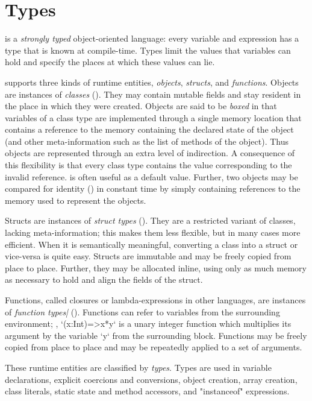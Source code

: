 \chapter{Types}
\label{XtenTypes}

{}\Xten{} is a {\em strongly typed} object-oriented language: every
variable and expression has a type that is known at compile-time.
Types limit the values that variables can hold and specify the places
at which these values can lie.


{}\Xten{} supports three kinds of runtime entities, {\em objects},
{\em structs}, and {\em functions}. Objects are instances of {\em
  classes} (). They may contain mutable fields
and stay resident in the place in which they were
created. 
Objects are said to be {\em boxed} in that variables of a
class type are implemented through a single memory location that
contains a reference to the memory containing the declared state of
the object (and other meta-information such as the list of methods of
the object). Thus objects are represented through an extra level of
indirection. A consequence of this flexibility is that every class
type contains the value  corresponding to the invalid
reference.  is often useful as a default value. Further, two
objects may be compared for identity (\Xcd{==}) in constant time by
simply containing references to the memory used to represent the
objects.

Structs are instances of {\em struct types} (). They are a
restricted variant of classes, lacking meta-information; this makes them less
flexible, but in many cases more efficient. When it is semantically
meaningful, converting a class into a struct or vice-versa is quite easy.
Structs are immutable and may be freely copied from place to place. Further,
they may be allocated inline, using only as much memory as necessary to hold
and align the fields of the struct.

Functions, called closures or lambda-expressions in other languages, are
instances of {\em function types|} (). Functions can refer to
variables from the surrounding environment; \eg, \xcd`(x:Int)=>x*y` is a unary
integer function which multiplies its argument by the variable \xcd`y` from
the surrounding block.  
Functions may be freely copied from place to place and may be repeatedly
applied to a set of arguments.

These runtime entities are classified by {\em types}. Types are used in
variable declarations, explicit coercions and conversions, object creation,
array creation, class literals, static state and method accessors, and
\xcd"instanceof" expressions.

